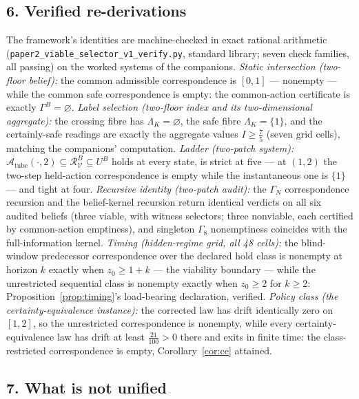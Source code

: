 \documentclass[10pt,twocolumn]{article}
\theoremstyle{definition}
\begin{document}
\subsection{6. Verified re-derivations}\label{verified}

The framework's identities are machine-checked in exact rational arithmetic
(\texttt{paper2\_viable\_selector\_v1\_verify.py}, standard library; seven check families, all
passing) on the worked systems of the companions. \emph{Static intersection
(two-floor belief):} the common admissible correspondence is \([0,1]\) ---
nonempty --- while the common safe correspondence is empty: the
common-action certificate is exactly \(\Gamma^{B} = \varnothing\).
\emph{Label selection (two-floor index and its two-dimensional aggregate):}
the crossing fibre has \(\Lambda_{K} = \varnothing\), the safe fibre
\(\Lambda_{K} = \{1\}\), and the certainly-safe readings are exactly the
aggregate values \(I \ge \tfrac75\) (seven grid cells), matching the
companions' computation. \emph{Ladder (two-patch system):}
\(\mathcal{A}_{\mathrm{tube}}(\cdot, 2) \subseteq
\mathcal{R}^{B}_{\mathcal{V}} \subseteq U^{B}\) holds at every state, is
strict at five --- at \((1,2)\) the two-step held-action correspondence is
empty while the instantaneous one is \(\{1\}\) --- and tight at four.
\emph{Recursive identity (two-patch audit):} the \(\Gamma_{N}\) correspondence
recursion and the belief-kernel recursion return identical verdicts on all
six audited beliefs (three viable, with witness selectors; three nonviable,
each certified by common-action emptiness), and singleton
\(\Gamma_{8}\) nonemptiness coincides with the full-information kernel.
\emph{Timing (hidden-regime grid, all 48 cells):} the blind-window
predecessor correspondence over the declared hold class is nonempty at
horizon \(k\) exactly when \(z_{0} \ge 1 + k\) --- the viability boundary ---
while the unrestricted sequential class is nonempty exactly when
\(z_{0} \ge 2\) for \(k \ge 2\): Proposition~\ref{prop:timing}'s
load-bearing declaration, verified. \emph{Policy class (the
certainty-equivalence instance):} the corrected law has drift identically
zero on \([1,2]\), so the unrestricted correspondence is nonempty, while
every certainty-equivalence law has drift at least \(\tfrac{21}{100} > 0\)
there and exits in finite time: the class-restricted correspondence is
empty, Corollary~\ref{cor:ce} attained.

\subsection{7. What is not unified}\label{discipline}
\end{document}

